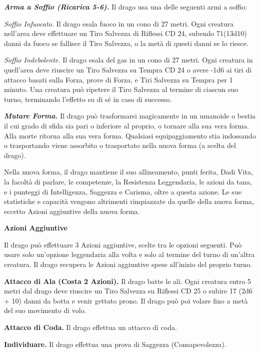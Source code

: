 \begin{multicols}{2}
\emph{\textbf{Arma a Soffio (Ricarica 5-6).}} Il drago usa una delle seguenti armi a soffio:

\emph{Soffio Infuocato.} Il drago esala fuoco in un cono di 27 metri. Ogni creatura nell'area deve effettuare un Tiro Salvezza di Riflessi CD 24, subendo 71(13d10) danni da fuoco se fallisce il Tiro Salvezza, o la metà di questi danni se lo riesce.

\emph{Soffio Indebolente.} Il drago esala del gas in un cono di 27 metri. Ogni creatura in quell'area deve riuscire un Tiro Salvezza su Tempra CD 24 o avere -1d6 ai tiri di attacco basati sulla Forza, prove di Forza, e Tiri Salvezza su Tempra per 1 minuto. Una creatura può ripetere il Tiro Salvezza al termine di ciascun suo turno, terminando l'effetto su di sé in caso di successo.

\emph{\textbf{Mutare Forma.}} Il drago può trasformarsi magicamente in un umanoide o bestia il cui grado di sfida sia pari o inferiore al proprio, o tornare alla sua vera forma. Alla morte ritorna alla sua vera forma. Qualsiasi equipaggiamento stia indossando o trasportando viene assorbito o trasportato nella nuova forma (a scelta del drago).

Nella nuova forma, il drago mantiene il suo allineamento, punti ferita, Dadi Vita, la facoltà di parlare, le competenze, la Resistenza Leggendaria, le azioni da tana, e i punteggi di Intelligenza, Saggezza e Carisma, oltre a questa azione. Le sue statistiche e capacità vengono altrimenti rimpiazzate da quelle della nuova forma, eccetto Azioni aggiuntive della nuova forma.

\textbf{Azioni Aggiuntive}

Il drago può effettuare 3 Azioni aggiuntive, scelte tra le opzioni seguenti. Può usare solo un'opzione leggendaria alla volta e solo al termine del turno di un'altra creatura. Il drago recupera le Azioni aggiuntive spese all'inizio del proprio turno.

\textbf{Attacco di Ala (Costa 2 Azioni).} Il drago batte le ali. Ogni creatura entro 5 metri dal drago deve riuscire un Tiro Salvezza su Riflessi CD 25 o subire 17 (2d6 + 10) danni da botta e venir gettato prono. Il drago può poi volare fino a metà del suo movimento di volo.

\textbf{Attacco di Coda.} Il drago effettua un attacco di coda.

\textbf{Individuare.} Il drago effettua una prova di Saggezza (Consapevolezza).


\end{multicols}
